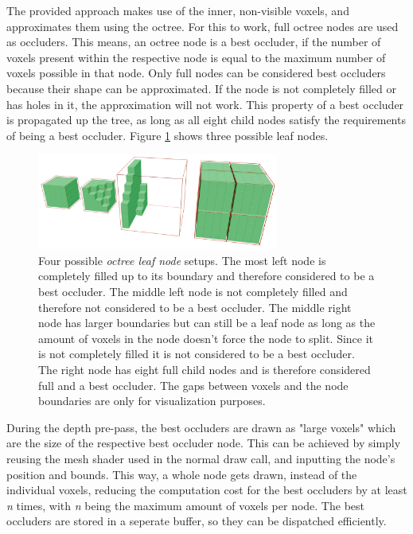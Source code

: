 \noindent
The provided approach makes use of the inner, non-visible voxels, and approximates them using the octree. For this 
to work, full octree nodes are used as occluders. This means, an octree node is a best occluder, if the number of 
voxels present within the respective node is equal to the maximum number of voxels possible in that node. Only full 
nodes can be considered best occluders because their shape can be approximated. If the node is not completely filled 
or has holes in it, the approximation will not work. This property of a best occluder is propagated up the tree, as 
long as all eight child nodes satisfy the requirements of being a best occluder. Figure 
\ref{fig:octreenode-filled-non-filled} shows three possible leaf nodes. 

\begin{figure}[h]
    \centering
    \includegraphics[width=300px]{images/graphics/octree-nodes-filled.jpg}
    \caption{Four possible \emph{octree leaf node} setups. The most left node is completely filled up to its 
    boundary and therefore considered to be a best occluder. The middle left node is not completely filled and therefore 
    not considered to be a best occluder. The middle right node has larger boundaries but can still be a leaf node as long 
    as the amount of voxels in the node doesn't force the node to split. Since it is not completely filled it is not 
    considered to be a best occluder. The right node has eight full child nodes and is therefore considered full and a best occluder.
    The gaps between voxels and the node boundaries are only for visualization purposes.}
    \label{fig:octreenode-filled-non-filled}
\end{figure}

\noindent
During the depth pre-pass, the best occluders are drawn as "large voxels" which are the size of the respective 
best occluder node. This can be achieved by simply reusing the mesh shader used in the normal draw call, and 
inputting the node's position and bounds. This way, a whole node gets drawn, instead of the individual voxels, 
reducing the computation cost for the best occluders by at least \emph{n} times, with \emph{n} being the maximum 
amount of voxels per node. The best occluders are stored in a seperate buffer, so they can be dispatched efficiently. \\

